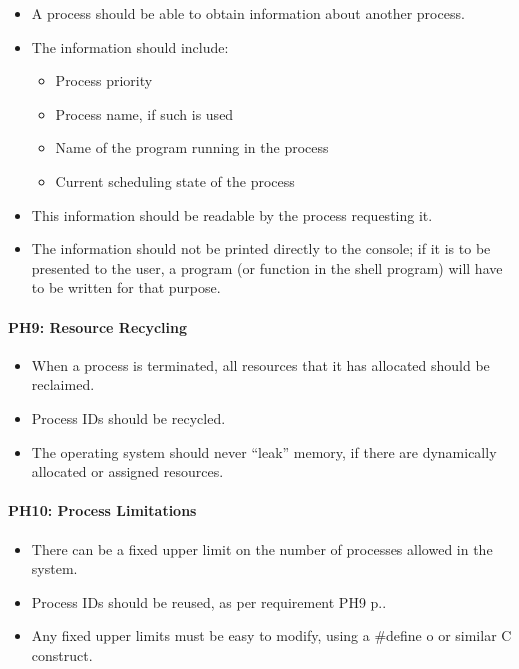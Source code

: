 \begin{itemize}
  \item A process should be able to obtain information about another process.
  \item  The information should include:
	 \begin{itemize}
		\item  Process priority
		\item  Process name, if such is used
		\item  Name of the program running in the process
		\item  Current scheduling state of the process
	 \end{itemize}
  \item  This information should be readable by the process requesting it.
  \item  The information should not be printed directly to the console; if it is to be presented to the user, a program (or function in the shell program) will have to be written for that purpose.
\end{itemize}

\paragraph*{PH9: Resource Recycling}
\label{pg:ph8}

\begin{itemize}
  \item When a process is terminated, all resources that it has allocated should be reclaimed.
  \item  Process IDs should be recycled.
  \item  The operating system should never ``leak'' memory, if there are dynamically allocated or assigned resources.
\end{itemize}

\paragraph*{PH10: Process Limitations}
\label{pg:ph10}

\begin{itemize}
  \item There can be a fixed upper limit on the number of processes allowed in the  system.
  \item  Process IDs should be reused, as per requirement PH9 p.\pageref{pg:ph9}.
  \item  Any fixed upper limits must be easy to modify, using a \#define o or similar C construct.
\end{itemize}

